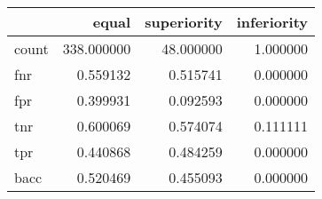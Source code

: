 \begin{tabular}{lrrr}
\toprule
{} &       equal &  superiority &  inferiority \\
\midrule
count &  338.000000 &    48.000000 &     1.000000 \\
fnr   &    0.559132 &     0.515741 &     0.000000 \\
fpr   &    0.399931 &     0.092593 &     0.000000 \\
tnr   &    0.600069 &     0.574074 &     0.111111 \\
tpr   &    0.440868 &     0.484259 &     0.000000 \\
bacc  &    0.520469 &     0.455093 &     0.000000 \\
\bottomrule
\end{tabular}
